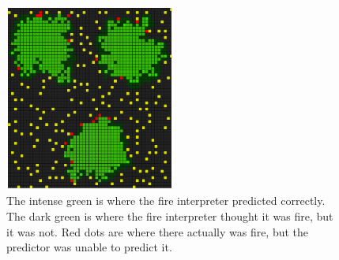 \begin{figure}[here]
  \centering
      \includegraphics[width=0.5\textwidth]{discussion/graphics/results-simple-compare.png}
  \caption{The intense green is where the fire interpreter predicted correctly. The dark green is where the fire interpreter thought it was fire, but it was not. Red dots are where there actually was fire, but the predictor was unable to predict it.}
  \label{fig:advanced-results1}
\end{figure}